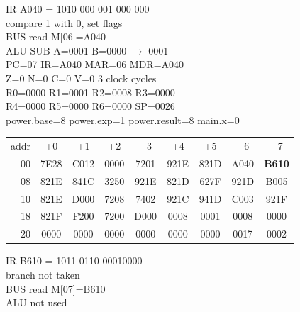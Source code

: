 \noindent\begin{tcolorbox}[stepbox, title={Step 22 \hfill PC 06 \quad CMP R1, R0}]
\textcolor{dim}{IR} A040 = 1010 000 001 000 000\\
compare 1 with 0, set flags\\
\textcolor{dim}{BUS} read M[06]=A040\\
\textcolor{dim}{ALU} SUB A=0001 B=0000 $\rightarrow$ 0001\\
PC=07 IR=A040 MAR=06 MDR=A040\\
Z=0 N=0 C=0 V=0 \hfill \textcolor{dim}{3 clock cycles}\\
R0=0000 R1=0001 R2=0008 R3=0000\\
R4=0000 R5=0000 R6=0000 SP=0026\\
\textcolor{dim}{power.base=8  power.exp=1  power.result=8  main.x=0}\\[1pt]
{\setlength{\tabcolsep}{1.6pt}\begin{tabular}{@{}r*{8}{c}@{}}
\textcolor{dim}{addr} & \textcolor{dim}{+0} & \textcolor{dim}{+1} & \textcolor{dim}{+2} & \textcolor{dim}{+3} & \textcolor{dim}{+4} & \textcolor{dim}{+5} & \textcolor{dim}{+6} & \textcolor{dim}{+7}\\
\textcolor{dim}{00} & 7E28 & C012 & 0000 & 7201 & 921E & 821D & A040 & \cellcolor{pcc}\textbf{B610}\\
\textcolor{dim}{08} & 821E & 841C & 3250 & 921E & 821D & 627F & 921D & B005\\
\textcolor{dim}{10} & 821E & D000 & 7208 & 7402 & 921C & 941D & C003 & 921F\\
\textcolor{dim}{18} & 821F & F200 & 7200 & D000 & \cellcolor{datac}0008 & \cellcolor{datac}0001 & \cellcolor{datac}0008 & \cellcolor{datac}0000\\
\textcolor{dim}{20} & \cellcolor{stackc}0000 & \cellcolor{stackc}0000 & \cellcolor{stackc}0000 & \cellcolor{stackc}0000 & \cellcolor{stackc}0000 & \cellcolor{stackc}0000 & \cellcolor{stackc}0017 & \cellcolor{stackc}0002\\
\end{tabular}}
\end{tcolorbox}\hfill\begin{tcolorbox}[stepbox, title={Step 23 \hfill PC 07 \quad BLE power.endwhile1}]
\textcolor{dim}{IR} B610 = 1011 0110 00010000\\
branch not taken\\
\textcolor{dim}{BUS} read M[07]=B610\\
\textcolor{dim}{ALU} \textcolor{dim}{not used}\\

\end{tcolorbox}
